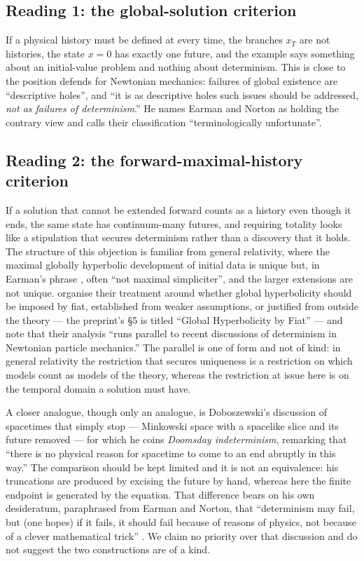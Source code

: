 \documentclass[12pt]{article}
\theoremstyle{plain}
\theoremstyle{definition}
\theoremstyle{remark}
\begin{document}
\subsection*{Reading 1: the global-solution criterion}

If a physical history must be defined at every time, the branches $x_{T}$ are
not histories, the state $x=0$ has exactly one future, and the example says
something about an initial-value problem and nothing about determinism. This is
close to the position \citet[p.~182]{Wilson} defends for Newtonian
mechanics: failures of global existence are ``descriptive holes'', and ``it is
as descriptive holes such issues should be addressed, \emph{not as failures of
determinism}.'' He names Earman and Norton as holding the contrary view and
calls their classification ``terminologically unfortunate''.

\subsection*{Reading 2: the forward-maximal-history criterion}

If a solution that cannot be extended forward counts as a history even though it
ends,
the same state has continuum-many futures, and requiring totality looks like a
stipulation that secures determinism rather than a discovery that it holds. The
structure of this objection is familiar from general relativity, where the
maximal globally hyperbolic development of initial data is unique but, in
Earman's phrase \citep[][\S6.4]{Earman}, often ``not maximal simpliciter'', and the
larger extensions are not unique. \citet{SmeenkWuthrich}
organise their treatment around whether global hyperbolicity should be imposed
by fiat, established from weaker assumptions, or justified from outside the
theory --- the preprint's \S5 is titled ``Global Hyperbolicity by Fiat'' --- and note
that their analysis ``runs parallel to recent discussions of determinism in
Newtonian particle mechanics.'' The parallel is one of form and not of kind: in
general relativity the restriction that secures uniqueness is a restriction on
which models count as models of the theory, whereas the restriction at issue
here is on the temporal domain a solution must have.

A closer analogue, though only an analogue, is Doboszewski's discussion
\citep[][p.~12]{Doboszewski} of spacetimes that simply stop --- Minkowski space
with a spacelike slice and its future removed --- for which he coins
\emph{Doomsday indeterminism}, remarking that ``there is no physical reason for
spacetime to come to an end abruptly in this way.'' The comparison should be
kept limited and it is not an equivalence: his truncations are produced by
excising the future by hand, whereas here the finite endpoint is generated by
the equation. That difference bears on his own desideratum, paraphrased from
Earman and Norton, that ``determinism may fail, but (one hopes) if it fails, it
should fail because of reasons of physics, not because of a clever mathematical
trick'' \citep[][p.~2]{Doboszewski}. We claim no priority over that discussion and
do not suggest the two constructions are of a kind.
\end{document}
